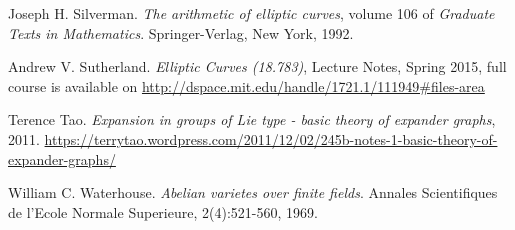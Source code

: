 \documentclass{article}
\theoremstyle{theorem}
\theoremstyle{definition}
\begin{document}
\begin{thebibliography}{}
	 Joseph H. Silverman. \textit{The arithmetic of elliptic curves}, volume 106 of \textit{Graduate Texts in Mathematics}. Springer-Verlag, New York, 1992.

	 Andrew V. Sutherland. \textit{  Elliptic Curves (18.783)}, Lecture Notes, Spring 2015, full course is available on \url{http://dspace.mit.edu/handle/1721.1/111949#files-area}
	
	 Terence Tao. \textit{Expansion in groups of Lie type  - basic theory of expander graphs}, 2011. \url{https://terrytao.wordpress.com/2011/12/02/245b-notes-1-basic-theory-of-expander-graphs/}
	
	 William C. Waterhouse. \textit{Abelian varietes over finite fields}. Annales Scientifiques de l'Ecole Normale Superieure, 2(4):521-560, 1969.
	
	
\end{thebibliography}
\end{document}
